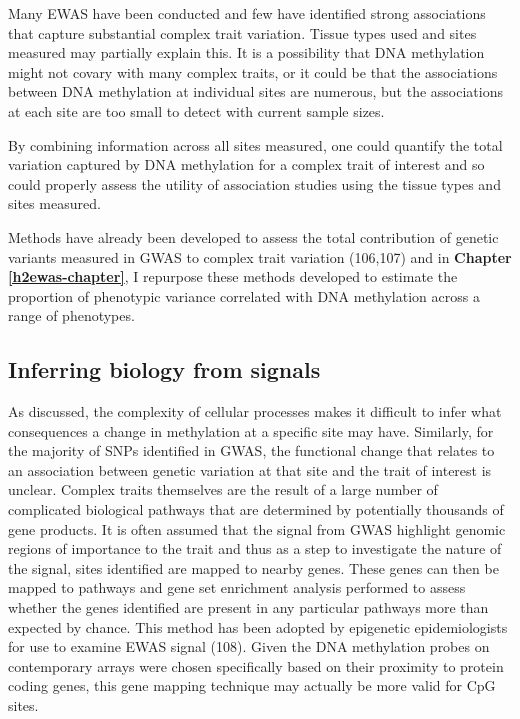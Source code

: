 \documentclass[11pt,oneside]{bristolthesis}
\begin{document}
Many EWAS have been conducted and few have identified strong associations that capture substantial complex trait variation. Tissue types used and sites measured may partially explain this. It is a possibility that DNA methylation might not covary with many complex traits, or it could be that the associations between DNA methylation at individual sites are numerous, but the associations at each site are too small to detect with current sample sizes.

By combining information across all sites measured, one could quantify the total variation captured by DNA methylation for a complex trait of interest and so could properly assess the utility of association studies using the tissue types and sites measured.

Methods have already been developed to assess the total contribution of genetic variants measured in GWAS to complex trait variation (106,107) and in \textbf{Chapter \ref{h2ewas-chapter}}, I repurpose these methods developed to estimate the proportion of phenotypic variance correlated with DNA methylation across a range of phenotypes.

\hypertarget{inferring-biology-from-signals}{%
\subsection{Inferring biology from signals}\label{inferring-biology-from-signals}}

As discussed, the complexity of cellular processes makes it difficult to infer what consequences a change in methylation at a specific site may have. Similarly, for the majority of SNPs identified in GWAS, the functional change that relates to an association between genetic variation at that site and the trait of interest is unclear. Complex traits themselves are the result of a large number of complicated biological pathways that are determined by potentially thousands of gene products. It is often assumed that the signal from GWAS highlight genomic regions of importance to the trait and thus as a step to investigate the nature of the signal, sites identified are mapped to nearby genes. These genes can then be mapped to pathways and gene set enrichment analysis performed to assess whether the genes identified are present in any particular pathways more than expected by chance. This method has been adopted by epigenetic epidemiologists for use to examine EWAS signal (108). Given the DNA methylation probes on contemporary arrays were chosen specifically based on their proximity to protein coding genes, this gene mapping technique may actually be more valid for CpG sites.
\end{document}
